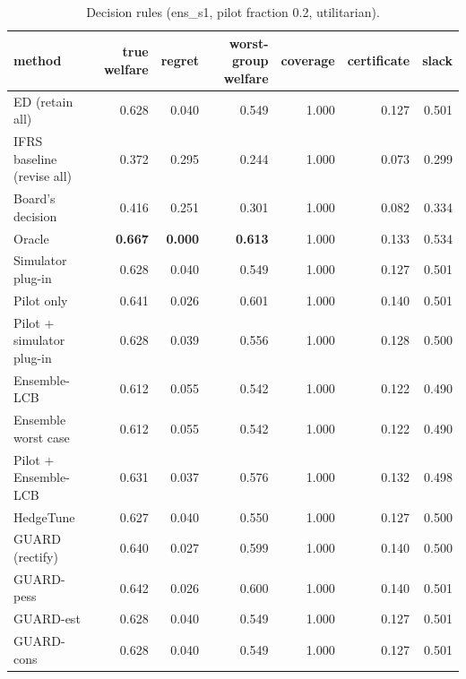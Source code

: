 \begin{table}[t]
\centering
\small
\begin{tabular}{lrrrrrr}
\toprule
method & true welfare & regret & worst-group welfare & coverage & certificate & slack \\
\midrule
ED (retain all) & 0.628 & 0.040 & 0.549 & 1.000 & 0.127 & 0.501 \\
IFRS baseline (revise all) & 0.372 & 0.295 & 0.244 & 1.000 & 0.073 & 0.299 \\
Board's decision & 0.416 & 0.251 & 0.301 & 1.000 & 0.082 & 0.334 \\
Oracle & \textbf{0.667} & \textbf{0.000} & \textbf{0.613} & 1.000 & 0.133 & 0.534 \\
Simulator plug-in & 0.628 & 0.040 & 0.549 & 1.000 & 0.127 & 0.501 \\
Pilot only & 0.641 & 0.026 & 0.601 & 1.000 & 0.140 & 0.501 \\
Pilot + simulator plug-in & 0.628 & 0.039 & 0.556 & 1.000 & 0.128 & 0.500 \\
Ensemble-LCB & 0.612 & 0.055 & 0.542 & 1.000 & 0.122 & 0.490 \\
Ensemble worst case & 0.612 & 0.055 & 0.542 & 1.000 & 0.122 & 0.490 \\
Pilot + Ensemble-LCB & 0.631 & 0.037 & 0.576 & 1.000 & 0.132 & 0.498 \\
HedgeTune & 0.627 & 0.040 & 0.550 & 1.000 & 0.127 & 0.500 \\
GUARD (rectify) & 0.640 & 0.027 & 0.599 & 1.000 & 0.140 & 0.500 \\
GUARD-pess & 0.642 & 0.026 & 0.600 & 1.000 & 0.140 & 0.501 \\
GUARD-est & 0.628 & 0.040 & 0.549 & 1.000 & 0.127 & 0.501 \\
GUARD-cons & 0.628 & 0.040 & 0.549 & 1.000 & 0.127 & 0.501 \\
\bottomrule
\end{tabular}
\caption{Decision rules (ens\_s1, pilot fraction 0.2, utilitarian).}
\label{tab:methods-utilitarian}
\end{table}
